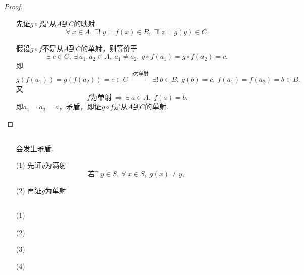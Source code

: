 \documentclass[UTF8]{ctexart}
\begin{document}
\subsection{}   %
\begin{proof}
    
    \begin{enumerate}
        \item []
        \item []先证$g\circ f$是从$A$到$C$的映射.
        \[
            \forall\ x\in A,\ \exists !\ y=f(x)\in B,\ \exists !\ z=g(y)\in C.
        \]
        \item []假设$g\circ f$不是从$A$到$C$的单射，则等价于
        \[
            \exists\ c\in C,\ \exists\ a_1,a_2\in A,\ a_1\neq a_2,\
            g\circ f(a_1)=g\circ f(a_2)=c.
        \]
        即
        \[
            g(f(a_1))=g(f(a_2))=c\in C
            \ \xrightarrow{g为单射}\ 
            \exists !\ b\in B,\ g(b)=c,\ 
            f(a_1)=f(a_2)=b\in B.    
        \]
        又
        \[
            f\mbox{为单射}
            \ \Rightarrow\ 
            \exists\ a\in A,\ f(a)=b.    
        \]
        即$a_1 = a_2 = a$，矛盾，即证$g\circ f$是从$A$到$C$的单射.
    \end{enumerate}
\end{proof}

\subsection{}   %
\begin{enumerate}
    \item []会发生矛盾.
    \item [(1)]先证$g$为满射
    \[
        \mbox{若}\exists\ y\in S,\ \forall\ x\in S,\ g(x)\neq y,\     
    \]

    \item [(2)]再证$g$为单射
    

\end{enumerate}

\subsection{}   %
\begin{enumerate}
    \item [(1)]
    \item [(2)]
    \item [(3)]
    \item [(4)]
\end{enumerate}
\end{document}
